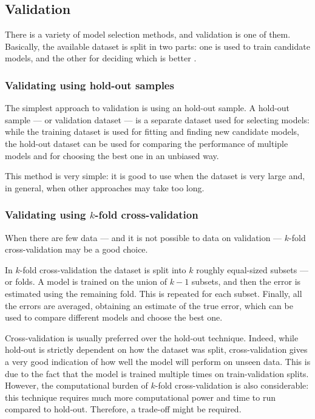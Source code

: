         \subsection{Validation}\label{validation}
            There is a variety of model selection methods, and validation is one of them. Basically, the available dataset is split in two parts: one is used to train candidate models, and the other for deciding which is better \cite[145]{Shalev-Shwartz}.
            \subsubsection{Validating using hold-out samples}
                The simplest approach to validation is using an hold-out sample. A hold-out sample --- or validation dataset --- is a separate dataset used for selecting models: while the training dataset is used for fitting and finding new candidate models, the hold-out dataset can be used for comparing the performance of multiple models and for choosing the best one in an unbiased way.
                
                This method is very simple: it is good to use when the dataset is very large and, in general, when other approaches may take too long.
            \subsubsection{Validating using \(k\)-fold cross-validation}
                When there are few data --- and it is not possible to  data on validation --- \(k\)-fold cross-validation may be a good choice.
                
                In \(k\)-fold cross-validation the dataset is split into \(k\) roughly equal-sized subsets --- or folds. A model is trained on the union of \(k-1\) subsets, and then the error is estimated using the remaining fold. This is repeated for each subset. Finally, all the errors are averaged, obtaining an estimate of the true error, which can be used to compare different models and choose the best one.

                Cross-validation is usually preferred over the hold-out technique. Indeed, while hold-out is strictly dependent on how the dataset was split, cross-validation gives a very good indication of how well the model will perform on unseen data. This is due to the fact that the model is trained multiple times on train-validation splits. However, the computational burden of \(k\)-fold cross-validation is also considerable: this technique requires much more computational power and time to run compared to hold-out. Therefore, a trade-off might be required.
                
